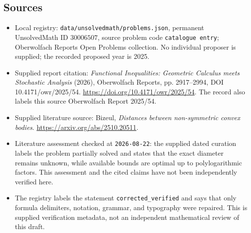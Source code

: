 \documentclass[11pt]{article}
\begin{document}
\subsection{Sources}
\begin{itemize}
\item Local registry: \texttt{data/unsolvedmath/problems.json}, permanent UnsolvedMath ID \(30006507\), source problem code \texttt{catalogue entry}; Oberwolfach Reports Open Problems collection. No individual proposer is supplied; the recorded proposed year is 2025.
\item Supplied report citation: \emph{Functional Inequalities: Geometric Calculus meets Stochastic Analysis} (2026), Oberwolfach Reports, pp. 2917--2994, DOI 10.4171/owr/2025/54. \url{https://doi.org/10.4171/owr/2025/54}. The record also labels this source Oberwolfach Report 2025/54.
\item Supplied literature source: Bizeul, \emph{Distances between non-symmetric convex bodies}. \url{https://arxiv.org/abs/2510.20511}.
\item Literature assessment checked at \texttt{2026-08-22}: the supplied dated curation labels the problem partially solved and states that the exact diameter remains unknown, while available bounds are optimal up to polylogarithmic factors. This assessment and the cited claims have not been independently verified here.
\item The registry labels the statement \texttt{corrected\_verified} and says that only formula delimiters, notation, grammar, and typography were repaired. This is supplied verification metadata, not an independent mathematical review of this draft.
\end{itemize}
\end{document}
